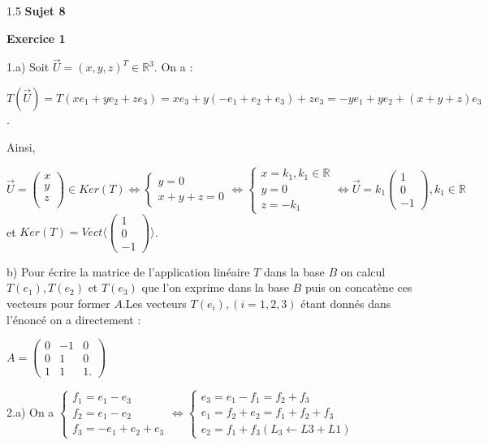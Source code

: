 \documentclass[12pt]{article}
\begin{document}
\begin{spacing}{1.5}
\medskip\textbf{Sujet 8}

\textbf{Exercice 1}

1.a) Soit $\overrightarrow{U}=(x,y,z)^T\in \mathbb{R}^3$. On a :

$T(\overrightarrow{U})=T(xe_1+ye_2+ze_3)=xe_3+y(-e_1+e_2+e_3)+ze_3=-ye_1+ye_2+(x+y+z)e_3$.

Ainsi, 

$\overrightarrow{U}=\begin{pmatrix}
x\\
y\\
z\\
\end{pmatrix}\in Ker(T)\Longleftrightarrow \begin{cases}
y=0\\
x+y+z=0
\end{cases}\Longleftrightarrow \begin{cases}
x=k_1, k_1\in \mathbb{R}\\
y=0\\
z=-k_1
\end{cases}\Longleftrightarrow \overrightarrow{U}=k_1\begin{pmatrix}
1\\
0\\
-1
\end{pmatrix}, k_1\in \mathbb{R}$ et $Ker(T)=Vect\langle \begin{pmatrix}
1\\
0\\
-1
\end{pmatrix}\rangle$.


b)  Pour écrire la matrice de l'application linéaire $T$ dans la base $B$ on calcul $T(e_1),
 T(e_2)$ et $T(e_3)$ que l'on exprime dans la base $B$ puis on concatène ces vecteurs pour former $A$.Les vecteurs $T(e_i),(i=1,2,3)$ étant donnés dans l'énoncé on a directement :
 
 $A=\begin{pmatrix}
 0 & -1 & 0 \\ 
 0 & 1 & 0 \\ 
 1 & 1 & 1.
 \end{pmatrix}$
 
 2.a) On a 
 $
 \begin{cases}
 f_1=e_1-e_3\\
 f_2=e_1-e_2\\
 f_3=-e_1+e_2+e_3
 \end{cases}\Leftrightarrow \begin{cases}
 e_3=e_1-f_1=f_2+f_3\\
 e_1=f_2+e_2=f_1+f_2+f_3\\
 e_2=f_1+f_3 (L_3\longleftarrow L3+L1)
 \end{cases}
 $
 

\end{spacing}
\end{document}
